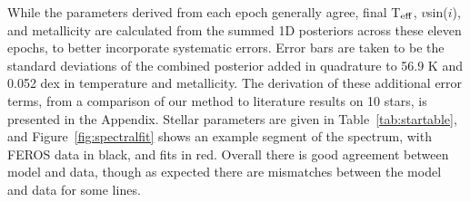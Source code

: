 \documentclass[]{aastex701} %
\begin{document}
 While the parameters derived from each epoch generally agree, final T$_{\rm eff}$, $v$sin($i$), and metallicity are calculated from the summed 1D posteriors across these eleven epochs, to better incorporate systematic errors.  Error bars are taken to be the standard deviations of the combined posterior added in quadrature to 56.9 K and 0.052 dex in temperature and metallicity. The derivation of these additional error terms, from a comparison of our method to literature results on 10 stars, is presented in the Appendix. Stellar parameters are given in Table~\ref{tab:startable}, and Figure~\ref{fig:spectralfit} shows an example segment of the spectrum, with FEROS data in black, and fits in red. Overall there is good agreement between model and data, though as expected there are mismatches between the model and data for some lines.
 
\end{document}

